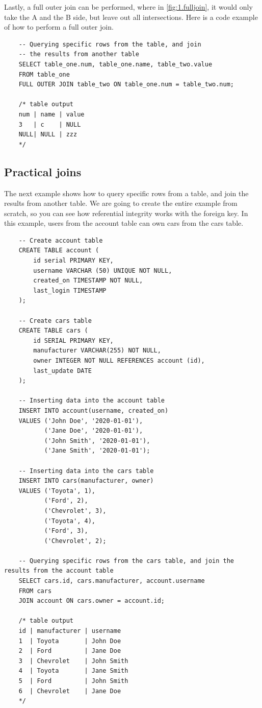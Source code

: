 Lastly, a full outer join can be performed, where in \cref{fig:1.fulljoin}, it would only take the A and the B side, but leave out all intersections. Here is a code example of how to perform a full outer join.

\begin{verbatim}
    -- Querying specific rows from the table, and join 
    -- the results from another table
    SELECT table_one.num, table_one.name, table_two.value
    FROM table_one
    FULL OUTER JOIN table_two ON table_one.num = table_two.num;

    /* table output
    num | name | value
    3   | c    | NULL
    NULL| NULL | zzz
    */
\end{verbatim}

\subsection{Practical joins}

The next example shows how to query specific rows from a table, and join the results from another table. We are going to create the entire example from scratch, so you can see how referential integrity works with the foreign key. In this example, users from the account table can own cars from the cars table.

\begin{verbatim}
    -- Create account table
    CREATE TABLE account (
        id serial PRIMARY KEY,
        username VARCHAR (50) UNIQUE NOT NULL,
        created_on TIMESTAMP NOT NULL, 
        last_login TIMESTAMP
    );

    -- Create cars table
    CREATE TABLE cars (
        id SERIAL PRIMARY KEY,
        manufacturer VARCHAR(255) NOT NULL,
        owner INTEGER NOT NULL REFERENCES account (id),
        last_update DATE
    );

    -- Inserting data into the account table
    INSERT INTO account(username, created_on)
    VALUES ('John Doe', '2020-01-01'),
           ('Jane Doe', '2020-01-01'),
           ('John Smith', '2020-01-01'),
           ('Jane Smith', '2020-01-01');

    -- Inserting data into the cars table
    INSERT INTO cars(manufacturer, owner)
    VALUES ('Toyota', 1),
           ('Ford', 2),
           ('Chevrolet', 3),
           ('Toyota', 4),
           ('Ford', 3),
           ('Chevrolet', 2);

    -- Querying specific rows from the cars table, and join the results from the account table
    SELECT cars.id, cars.manufacturer, account.username
    FROM cars
    JOIN account ON cars.owner = account.id;

    /* table output
    id | manufacturer | username
    1  | Toyota       | John Doe
    2  | Ford         | Jane Doe
    3  | Chevrolet    | John Smith
    4  | Toyota       | Jane Smith
    5  | Ford         | John Smith
    6  | Chevrolet    | Jane Doe
    */
\end{verbatim}



